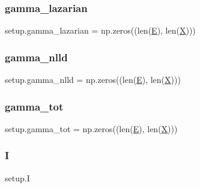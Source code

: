 \mbox{\label{namespacesetup_ad74ea64c023d17d39c8273fa19749122}} 
\subsubsection{\texorpdfstring{gamma\+\_\+lazarian}{gamma\_lazarian}}
{\footnotesize\ttfamily setup.\+gamma\+\_\+lazarian = np.\+zeros((len(\hyperlink{namespacesetup_a8bf3113e27e2925ec3309507c6d5ebf2}{E}), len(\hyperlink{namespacesetup_a0d71901ea06bb31a1b5e9e742158486f}{X})))}

\mbox{\label{namespacesetup_ad9e96625807078a846052e9e968ee812}} 
\subsubsection{\texorpdfstring{gamma\+\_\+nlld}{gamma\_nlld}}
{\footnotesize\ttfamily setup.\+gamma\+\_\+nlld = np.\+zeros((len(\hyperlink{namespacesetup_a8bf3113e27e2925ec3309507c6d5ebf2}{E}), len(\hyperlink{namespacesetup_a0d71901ea06bb31a1b5e9e742158486f}{X})))}

\mbox{\label{namespacesetup_a153d6750beb585c437e244ab6bdb8fba}} 
\subsubsection{\texorpdfstring{gamma\+\_\+tot}{gamma\_tot}}
{\footnotesize\ttfamily setup.\+gamma\+\_\+tot = np.\+zeros((len(\hyperlink{namespacesetup_a8bf3113e27e2925ec3309507c6d5ebf2}{E}), len(\hyperlink{namespacesetup_a0d71901ea06bb31a1b5e9e742158486f}{X})))}

\mbox{\label{namespacesetup_a80b60e7f494b760103b64ee56d20286d}} 
\subsubsection{\texorpdfstring{I}{I}}
{\footnotesize\ttfamily setup.\+I}

\mbox{\label{namespacesetup_afeeaa628cdb2ab3b24fbdde768e5a0bc}} 
